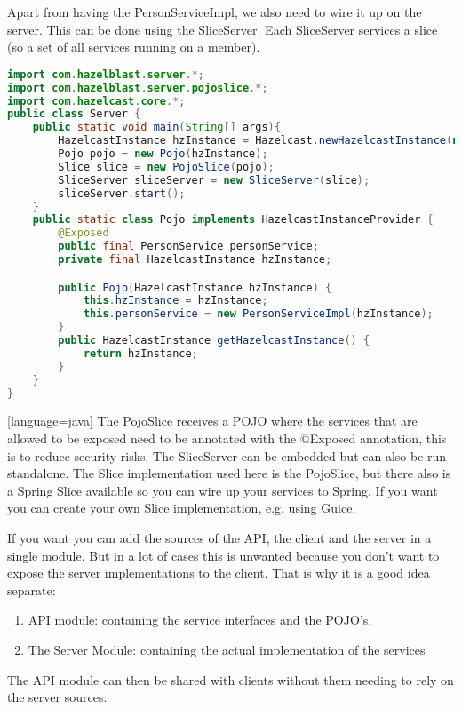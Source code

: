 Apart from having the PersonServiceImpl, we also need to wire it up on the server. This can be done using the SliceServer. Each SliceServer services a slice (so a set of all services running on a member).
\begin{lstlisting}[language=java]
import com.hazelblast.server.*;
import com.hazelblast.server.pojoslice.*;
import com.hazelcast.core.*;
public class Server {
    public static void main(String[] args){
        HazelcastInstance hzInstance = Hazelcast.newHazelcastInstance(null);
        Pojo pojo = new Pojo(hzInstance);
        Slice slice = new PojoSlice(pojo);
        SliceServer sliceServer = new SliceServer(slice);
        sliceServer.start();
    }
    public static class Pojo implements HazelcastInstanceProvider {
        @Exposed
        public final PersonService personService;
        private final HazelcastInstance hzInstance;

        public Pojo(HazelcastInstance hzInstance) {
            this.hzInstance = hzInstance;
            this.personService = new PersonServiceImpl(hzInstance);
        }
        public HazelcastInstance getHazelcastInstance() {
            return hzInstance;
        }
    }
}
\end{lstlisting}[language=java]
The PojoSlice receives a POJO where the services that are allowed to be exposed need to be annotated with the @Exposed annotation, this is to reduce security risks. The SliceServer can be embedded but can also be run standalone. The Slice implementation used here is the PojoSlice, but there also is a Spring Slice available so you can wire up your services to Spring. If you want you can create your own Slice implementation, e.g. using Guice.

If you want you can add the sources of the API, the client and the server in a single module. But in a lot of cases this is unwanted because you don't want to expose the server implementations to the client. That is why it is a good idea separate:
\begin{enumerate}
\item API module: containing the service interfaces and the POJO's.
\item The Server Module: containing the actual implementation of the services
\end{enumerate}
The API module can then be shared with clients without them needing to rely on the server sources.

